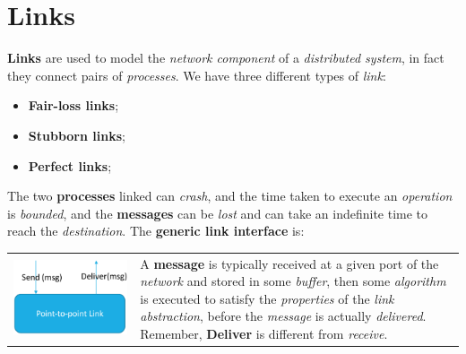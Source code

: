 \documentclass{article}
\begin{document}
\section{ Links}
\textbf{Links} are used to model the \emph{network component} of a \emph{distributed system}, in fact they connect pairs of \emph{processes}. We have three different types of \emph{link}:
\begin{itemize}
\item \textbf{Fair-loss links};
\item \textbf{Stubborn links};
\item \textbf{Perfect links};
\end{itemize}
The two \textbf{processes} linked can \emph{crash}, and the time taken to execute an \emph{operation} is \emph{bounded}, and the \textbf{messages} can be \emph{lost} and can take an indefinite time to reach the \emph{destination}. The \textbf{generic link interface} is:\\
\begin{tabular}{C{5cm}  L{9.5cm}}
   \includegraphics[scale=0.6]{cattura9.png} &  A \textbf{message} is typically received at a given port of the \emph{network} and stored in some \emph{buffer}, then some \emph{algorithm} is executed to satisfy the \emph{properties} of the \emph{link abstraction}, before the \emph{message} is actually \emph{delivered}. Remember, \textbf{Deliver} is different from \emph{receive}.
\end{tabular}\\\\
\end{document}
